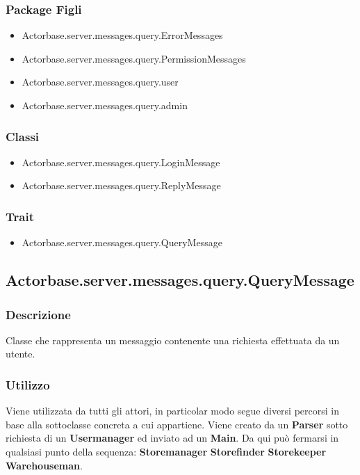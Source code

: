 \documentclass[a4paper]{article}
\begin{document}
			\subsubsection{Package Figli}
				\begin{itemize}
					\item Actorbase.server.messages.query.ErrorMessages
					\item Actorbase.server.messages.query.PermissionMessages
					\item Actorbase.server.messages.query.user
					\item Actorbase.server.messages.query.admin
				\end{itemize}
				
			\subsubsection{Classi}
				\begin{itemize}
					\item Actorbase.server.messages.query.LoginMessage
					\item Actorbase.server.messages.query.ReplyMessage
				\end{itemize}
				
			\subsubsection{Trait}
				\begin{itemize}
					\item Actorbase.server.messages.query.QueryMessage
				\end{itemize}

		\subsection{Actorbase.server.messages.query.QueryMessage}
		\label{QueryMessage}
			\subsubsection{Descrizione}
				Classe che rappresenta un messaggio contenente una richiesta effettuata da un utente.
				
			\subsubsection{Utilizzo}
				Viene utilizzata da tutti gli attori, in particolar modo segue diversi percorsi in base alla sottoclasse concreta a cui appartiene.
				Viene creato da un \textbf{Parser} sotto richiesta di un \textbf{Usermanager} ed inviato ad un \textbf{Main}. Da qui può fermarsi in 
				qualsiasi punto della sequenza: \textbf{Storemanager} \space \rightarrow \space \textbf{Storefinder} 
				\space \rightarrow \space \textbf{Storekeeper} \space \rightarrow \space \textbf{Warehouseman}.
\end{document}
